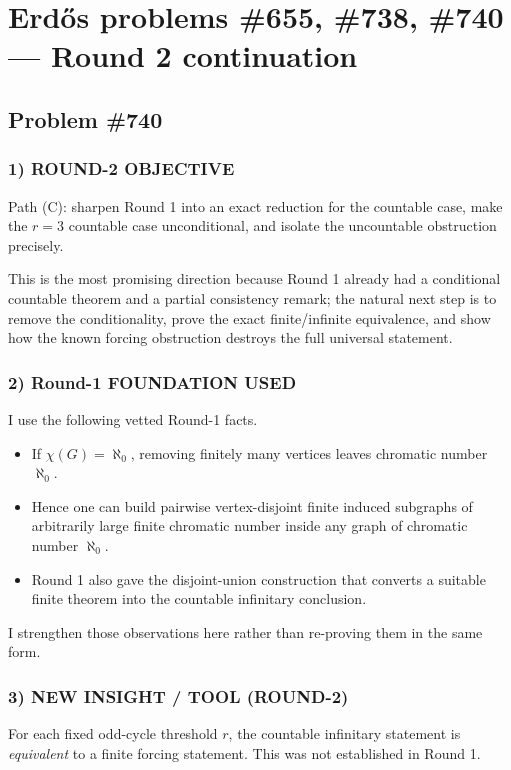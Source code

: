 \section{Erd\H{o}s problems \#655, \#738, \#740 --- Round 2 continuation}

\subsection*{Problem \#740}

\subsubsection*{1) ROUND-2 OBJECTIVE}
Path (C): sharpen Round 1 into an exact reduction for the countable case, make the $r=3$ countable case unconditional, and isolate the uncountable obstruction precisely.

This is the most promising direction because Round 1 already had a conditional countable theorem and a partial consistency remark; the natural next step is to remove the conditionality, prove the exact finite/infinite equivalence, and show how the known forcing obstruction destroys the full universal statement.

\subsubsection*{2) Round-1 FOUNDATION USED}
I use the following vetted Round-1 facts.

\begin{itemize}
\item If $\chi(G)=\aleph_0$, removing finitely many vertices leaves chromatic number $\aleph_0$.
\item Hence one can build pairwise vertex-disjoint finite induced subgraphs of arbitrarily large finite chromatic number inside any graph of chromatic number $\aleph_0$.
\item Round 1 also gave the disjoint-union construction that converts a suitable finite theorem into the countable infinitary conclusion.
\end{itemize}

I strengthen those observations here rather than re-proving them in the same form.

\subsubsection*{3) NEW INSIGHT / TOOL (ROUND-2)}
For each fixed odd-cycle threshold $r$, the countable infinitary statement is \emph{equivalent} to a finite forcing statement. This was not established in Round 1.

